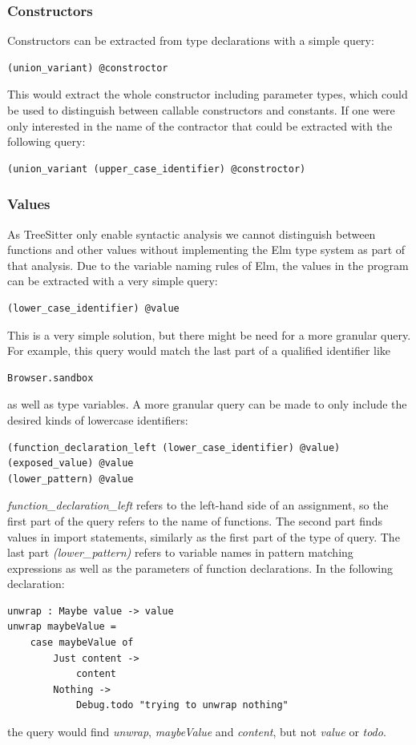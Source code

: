\documentclass[../thesis.tex]{subfiles}
\begin{document}
\subsubsection{Constructors}
Constructors can be extracted from type declarations with a simple query:
\begin{verbatim}
(union_variant) @constroctor
\end{verbatim}
This would extract the whole constructor including parameter types, which could be used to distinguish
between callable constructors and constants.
If one were only interested in the name of the contractor that could be extracted with the following query:
\begin{verbatim}
(union_variant (upper_case_identifier) @constroctor)
\end{verbatim}

\subsubsection{Values}
As TreeSitter only enable syntactic analysis we cannot distinguish between functions and other values
without implementing the Elm type system as part of that analysis.
Due to the variable naming rules of Elm, the values in the program can be extracted with a very simple query:
\begin{verbatim}
(lower_case_identifier) @value
\end{verbatim}
This is a very simple solution, but there might be need for a more granular query.
For example, this query would match the last part of a qualified identifier like
\begin{verbatim}
Browser.sandbox
\end{verbatim}
as well as type variables.
A more granular query can be made to only include the desired kinds of lowercase identifiers:
\begin{verbatim}
(function_declaration_left (lower_case_identifier) @value)
(exposed_value) @value
(lower_pattern) @value
\end{verbatim}
\textit{function\_declaration\_left} refers to the left-hand side of an assignment, so the first part of the query refers to the name of functions.
The second part finds values in import statements, similarly as the first part of the type of query.
The last part \textit{(lower\_pattern)} refers to variable names in pattern matching expressions as well as the parameters of function declarations.
In the following declaration:
\begin{verbatim}
unwrap : Maybe value -> value
unwrap maybeValue =
    case maybeValue of
        Just content ->
            content
        Nothing ->
            Debug.todo "trying to unwrap nothing"
\end{verbatim}
the query would find \textit{unwrap}, \textit{maybeValue} and \textit{content}, but not \textit{value} or \textit{todo}.
\end{document}
